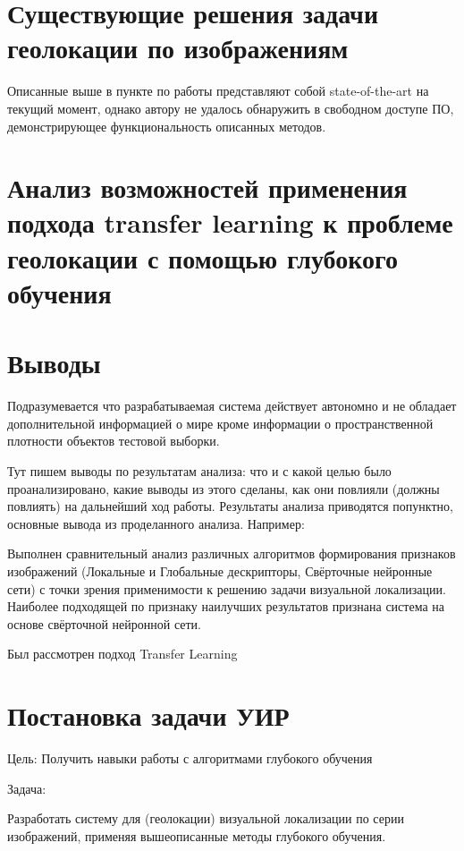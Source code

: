 \section{Существующие решения задачи геолокации по изображениям}

Описанные выше в пункте по работы \cite{weyand2016planet} представляют собой state-of-the-art на текущий момент, однако автору не удалось обнаружить в свободном доступе ПО, демонстрирующее функциональность описанных методов. 


\section{Анализ возможностей применения подхода transfer learning к проблеме геолокации с помощью глубокого обучения}



\section{Выводы}

Подразумевается что разрабатываемая система действует автономно и не обладает дополнительной информацией о мире кроме информации о пространственной плотности объектов тестовой выборки.

Тут пишем выводы по результатам анализа: что и с какой целью было проанализировано, какие выводы из этого сделаны, как они повлияли (должны повлиять) на дальнейший ход работы. Результаты анализа приводятся попунктно, основные вывода из проделанного анализа. Например:

\begin{compactenum}
	\item Выполнен сравнительный анализ различных алгоритмов формирования признаков изображений (Локальные и Глобальные дескрипторы, Свёрточные нейронные сети) с точки зрения применимости к решению задачи визуальной локализации. Наиболее подходящей по признаку наилучших результатов признана система на основе свёрточной нейронной сети.
	\item Был рассмотрен подход Transfer Learning 
	\item 
\end{compactenum}



\section{Постановка задачи УИР}

Цель:
Получить навыки работы с алгоритмами глубокого обучения

Задача:

Разработать систему для (геолокации) визуальной локализации по серии изображений, применяя вышеописанные методы глубокого обучения.

